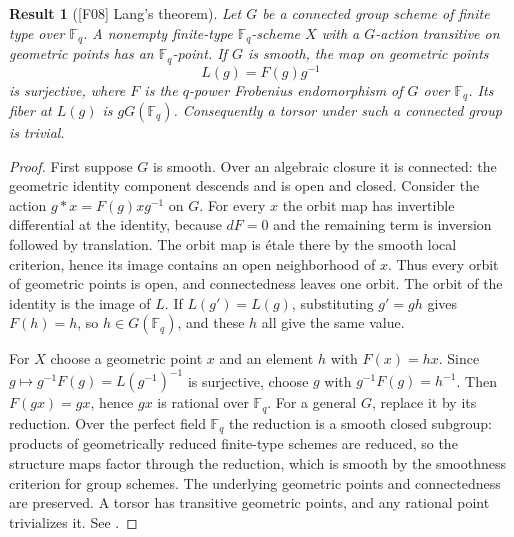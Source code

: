 \documentclass[11pt,a4paper,openany,oneside]{book}
\theoremstyle{resultstyle}
\newtheorem{statement}{Result}[chapter]
\newenvironment{result}[2]{\clubpenalty=10000\begin{statement}[\textnormal{[#1]} #2]\leavevmode\label{res:#1}\ignorespaces}{\end{statement}}
\theoremstyle{definition}
\numberwithin{equation}{chapter}
\newcommand{\FF}{\mathbb{F}}
\begin{document}
\begin{result}{F08}{Lang's theorem}
Let $G$ be a connected group scheme of finite type over $\FF_q$. A nonempty finite-type $\FF_q$-scheme $X$ with a $G$-action transitive on geometric points has an $\FF_q$-point. If $G$ is smooth, the map on geometric points
\[
 L(g)=F(g)g^{-1}
\]
is surjective, where $F$ is the $q$-power Frobenius endomorphism of $G$ over $\FF_q$. Its fiber at $L(g)$ is $gG(\FF_q)$. Consequently a torsor under such a connected group is trivial.
\end{result}
\begin{proof}
First suppose $G$ is smooth. Over an algebraic closure it is connected: the geometric identity component descends and is open and closed. Consider the action $g*x=F(g)xg^{-1}$ on $G$. For every $x$ the orbit map has invertible differential at the identity, because $dF=0$ and the remaining term is inversion followed by translation. The orbit map is \'{e}tale there by the smooth local criterion, hence its image contains an open neighborhood of $x$. Thus every orbit of geometric points is open, and connectedness leaves one orbit. The orbit of the identity is the image of $L$. If $L(g')=L(g)$, substituting $g'=gh$ gives $F(h)=h$, so $h\in G(\FF_q)$, and these $h$ all give the same value.

For $X$ choose a geometric point $x$ and an element $h$ with $F(x)=hx$. Since $g\mapsto g^{-1}F(g)=L(g^{-1})^{-1}$ is surjective, choose $g$ with $g^{-1}F(g)=h^{-1}$. Then $F(gx)=gx$, hence $gx$ is rational over $\FF_q$. For a general $G$, replace it by its reduction. Over the perfect field $\FF_q$ the reduction is a smooth closed subgroup: products of geometrically reduced finite-type schemes are reduced, so the structure maps factor through the reduction, which is smooth by the smoothness criterion for group schemes. The underlying geometric points and connectedness are preserved. A torsor has transitive geometric points, and any rational point trivializes it. See \cite[Theorem A.1.1 and Proposition A.1.3]{conradfeng}.
\end{proof}
\end{document}
